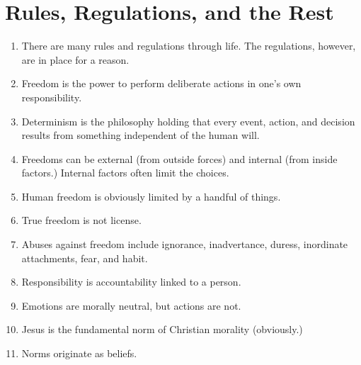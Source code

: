 \documentclass[10pt]{article}
\begin{document}
\section{Rules, Regulations, and the Rest}
\begin{enumerate}
	\item There are many rules and regulations through life.  The regulations, 
		however, are in place for a reason.
	\item Freedom is the power to perform deliberate actions in one's own responsibility.
	\item Determinism is the philosophy holding that every event, action, and 
		decision results from something independent of the human will.
	\item Freedoms can be external (from outside forces) and internal (from 
		inside factors.)  Internal factors often limit the choices.
	\item Human freedom is obviously limited by a handful of things.
	\item True freedom is not license.
	\item Abuses against freedom include ignorance, inadvertance, duress, 
		inordinate attachments, fear, and habit.
	\item Responsibility is accountability linked to a person.  
	\item Emotions are morally neutral, but actions are not.  
	\item Jesus is the fundamental norm of Christian morality (obviously.)  
	\item Norms originate as beliefs.  
\end{enumerate}
\end{document}
